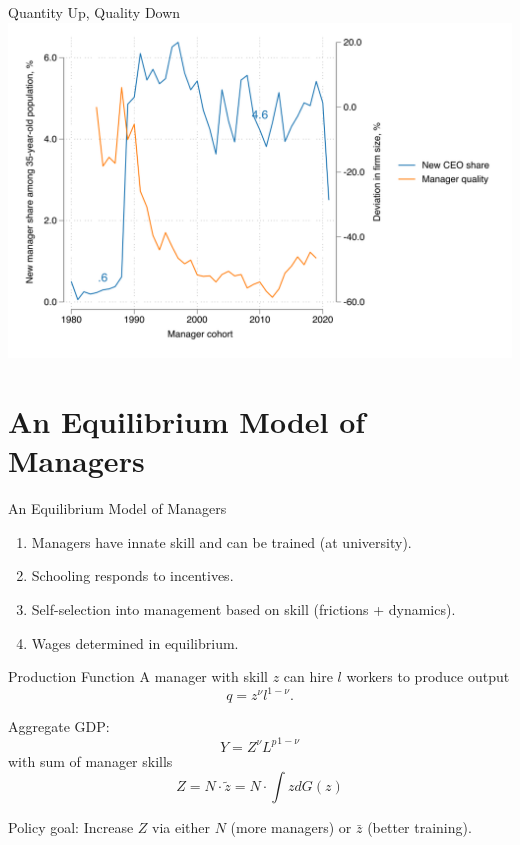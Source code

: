 \documentclass[
  ignorenonframetext,
  aspectratio=1610,
]{beamer}
\providecommand{\tightlist}{%
  \setlength{\itemsep}{0pt}\setlength{\parskip}{0pt}}
\begin{document}
\begin{frame}{Quantity Up, Quality Down}
\protect\hypertarget{quantity-up-quality-down}{}
\includegraphics{fig/ceo-flow-with-FE.png}
\end{frame}

\section{An Equilibrium Model of
Managers}\label{an-equilibrium-model-of-managers}

\begin{frame}{An Equilibrium Model of Managers}
\protect\hypertarget{an-equilibrium-model-of-managers-1}{}
\begin{enumerate}
\tightlist
\item
  Managers have innate skill and can be trained (at university).
\item
  Schooling responds to incentives.
\item
  Self-selection into management based on skill (frictions + dynamics).
\item
  Wages determined in equilibrium.
\end{enumerate}
\end{frame}

\begin{frame}{Production Function}
\protect\hypertarget{production-function}{}
A manager with skill \(z\) can hire \(l\) workers to produce output
\[q = z^\nu l^{1-\nu}.\]

\pause

Aggregate GDP: \[Y = Z^\nu {L^{p}}^{1-\nu}\] with sum of manager skills
\[Z = N\cdot \tilde z = N\cdot\int\! z dG(z)\]

\pause

Policy goal: Increase \(Z\) via either \(N\) (more managers) or
\(\bar z\) (better training).
\end{frame}
\end{document}
